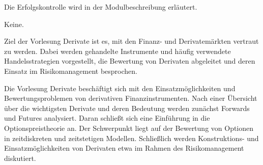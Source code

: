 \begin{course}

\setdoclanguagegerman
{}



\coursehead


\label{cour_4501.dp_997}


\begin{styleenv}
\begin{assessment}
Die Erfolgskontrolle wird in der Modulbeschreibung erläutert.


\end{assessment}

\begin{conditions}Keine.\end{conditions}


\end{styleenv}

\begin{learningoutcomes}
Ziel der Vorlesung Derivate ist es, mit den Finanz- und Derivatemärkten vertraut zu werden. Dabei werden gehandelte Instrumente und häufig verwendete Handelsstrategien vorgestellt, die Bewertung von Derivaten abgeleitet und deren Einsatz im Risikomanagement besprochen.


\end{learningoutcomes}

\begin{content}
Die Vorlesung Derivate beschäftigt sich mit den Einsatzmöglichkeiten und Bewertungsproblemen von derivativen Finanzinstrumenten. Nach einer Übersicht über die wichtigsten Derivate und deren Bedeutung werden zunächst Forwards und Futures analysiert. Daran schließt sich eine Einführung in die Optionspreistheorie an. Der Schwerpunkt liegt auf der Bewertung von Optionen in zeitdiskreten und zeitstetigen Modellen. Schließlich werden Konstruktions- und Einsatzmöglichkeiten von Derivaten etwa im Rahmen des Risikomanagement diskutiert.



\end{content}
\end{course}
